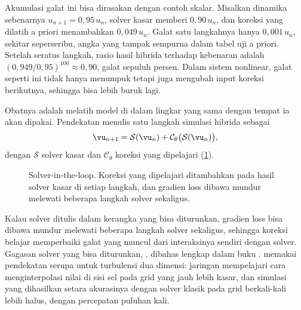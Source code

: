 Akumulasi galat ini bisa dirasakan dengan contoh skalar. Misalkan dinamika sebenarnya $u_{n+1}=0{,}95\,u_n$, solver
kasar memberi $0{,}90\,u_n$, dan koreksi yang dilatih a priori menambahkan $0{,}049\,u_n$. Galat satu langkahnya
hanya $0{,}001\,u_n$, sekitar seperseribu, angka yang tampak sempurna dalam tabel uji a priori. Setelah seratus
langkah, rasio hasil hibrida terhadap kebenaran adalah $(0{,}949/0{,}95)^{100}\approx0{,}90$, galat sepuluh persen.
Dalam sistem nonlinear, galat seperti ini tidak hanya menumpuk tetapi juga mengubah input koreksi berikutnya,
sehingga bisa lebih buruk lagi.

Obatnya adalah melatih model di dalam lingkar yang sama dengan tempat ia akan dipakai. Pendekatan
 \citep{um2020} menulis satu langkah simulasi hibrida sebagai
\begin{equation}
\vu_{n+1}=\mathcal S(\vu_n)+\mathcal C_\theta\big(\mathcal S(\vu_n)\big),
\end{equation}
dengan $\mathcal S$ solver kasar dan $\mathcal C_\theta$ koreksi yang dipelajari (\cref{fig:hibrida}).

\begin{figure}[ht]
\centering
{}
\caption{Solver-in-the-loop. Koreksi yang dipelajari ditambahkan pada hasil solver kasar di setiap langkah, dan
gradien loss dibawa mundur melewati beberapa langkah solver sekaligus.}
\label{fig:hibrida}
\end{figure} Kalau solver ditulis
dalam kerangka yang bisa diturunkan, gradien loss bisa dibawa mundur melewati beberapa langkah solver
sekaligus, sehingga koreksi belajar memperbaiki galat yang muncul dari interaksinya sendiri dengan solver.
Gagasan solver yang bisa diturunkan, , dibahas lengkap dalam buku
\citet{thuerey2021}. \citet{kochkov2021} memakai pendekatan serupa untuk turbulensi dua dimensi: jaringan
mempelajari cara menginterpolasi nilai di sisi sel pada grid yang jauh lebih kasar, dan simulasi yang
dihasilkan setara akurasinya dengan solver klasik pada grid berkali-kali lebih halus, dengan percepatan
puluhan kali.


